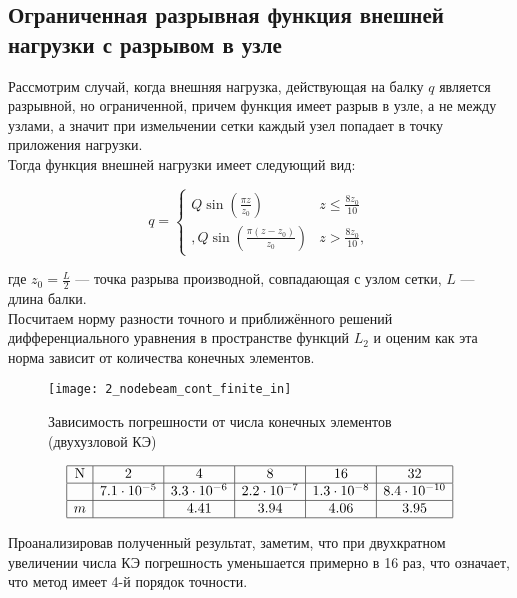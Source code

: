 \documentclass[12pt,a4paper]{article}
\begin{document}
\subsection[Ограниченная функция внешней нагрузки с разрывом в узле]{Ограниченная разрывная функция внешней нагрузки с разрывом в узле}

Рассмотрим случай, когда внешняя нагрузка, действующая на балку $q$ является разрывной, но ограниченной, причем функция имеет разрыв в узле, а не между узлами, а значит при измельчении сетки каждый узел попадает в точку приложения нагрузки. \\

 Тогда функция внешней нагрузки имеет следующий вид:

\begin{equation}
q = 
 \begin{cases}
	Q \sin \left(\frac{\pi  z}{z_{0}}\right) & z \leq \frac{8 z_{0}}{10} \\,
    Q \sin \left(\frac{\pi  (z-z_{0})}{z_{0}}\right) & z > \frac{8 z_{0}}{10} ,
 \end{cases}
\end{equation}

где $z_{0}=\frac{L}{2}$ --- точка разрыва производной, совпадающая с узлом сетки, $L$ --- длина балки. \\

Посчитаем норму разности точного и приближённого решений дифференциального уравнения в пространстве функций $L_{2}$  и оценим как эта норма зависит от количества конечных элементов.\\

\begin{figure}[H]
	\centering
	\texttt{[image: 2\_nodebeam\_cont\_finite\_in]}
	\caption{Зависимость погрешности от числа конечных элементов (двухузловой КЭ)}
	\label{fig:2_nodebeam_cont_finite_in}
\end{figure}
\[
\begin{array}{|c|c|c|c|c|c|}
	\hline
	\text{N} & 2 & 4 & 8 & 16 & 32 \\ \hline
\Delta  & 7.1 \cdot 10^{-5} & 3.3 \cdot 10^{-6} & 2.2 \cdot 10^{-7} & 1.3 \cdot 10^{-8} & 8.4 \cdot 10^{-10}\\ \hline
m  &  & 4.41 & 3.94 & 4.06 & 3.95 \\ 
	\hline
	\end{array}
	\]

Проанализировав полученный результат, заметим, что при двухкратном увеличении числа КЭ погрешность уменьшается примерно в 16 раз, что означает, что метод имеет 4-й порядок точности.\\
\end{document}
